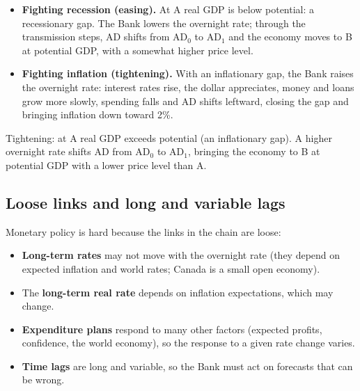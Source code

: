 \begin{itemize}
  \item \textbf{Fighting recession (easing).} At A real GDP is below potential: a
        recessionary gap. The Bank lowers the overnight rate; through the transmission
        steps, AD shifts from AD$_0$ to AD$_1$ and the economy moves to B at potential GDP,
        with a somewhat higher price level.
  \item \textbf{Fighting inflation (tightening).} With an inflationary gap, the Bank raises
        the overnight rate: interest rates rise, the dollar appreciates, money and loans
        grow more slowly, spending falls and AD shifts leftward, closing the gap and
        bringing inflation down toward 2\%.
\end{itemize}

\begin{center}
\end{center}
Tightening: at A real GDP exceeds potential (an inflationary gap). A higher overnight rate
shifts AD from AD$_0$ to AD$_1$, bringing the economy to B at potential GDP with a lower
price level than A.

\subsection{Loose links and long and variable lags}

Monetary policy is hard because the links in the chain are loose:
\begin{itemize}
  \item \textbf{Long-term rates} may not move with the overnight rate (they depend on
        expected inflation and world rates; Canada is a small open economy).
  \item The \textbf{long-term real rate} depends on inflation expectations, which may
        change.
  \item \textbf{Expenditure plans} respond to many other factors (expected profits,
        confidence, the world economy), so the response to a given rate change varies.
  \item \textbf{Time lags} are long and variable, so the Bank must act on forecasts that
        can be wrong.
\end{itemize}

